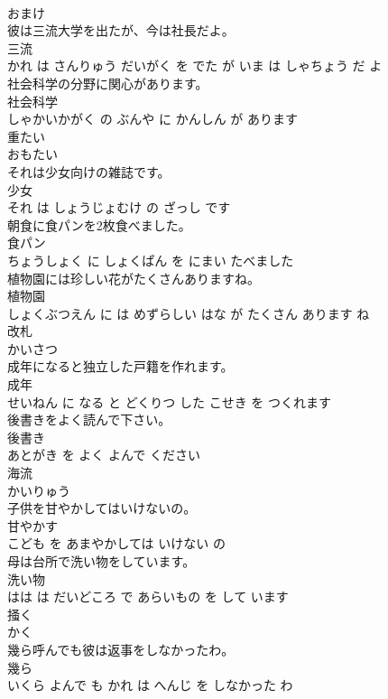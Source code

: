 \documentclass[8pt]{extreport}
\begin{document}
\begin{CJK}{UTF8}{min}
\\	おまけ			
\\	彼は三流大学を出たが、今は社長だよ。	
\\	三流 
\\	かれ は さんりゅう だいがく を でた が いま は しゃちょう だ よ			
\\	社会科学の分野に関心があります。	
\\	社会科学 
\\	しゃかいかがく の ぶんや に かんしん が あります			
\\	重たい	
\\	おもたい			
\\	それは少女向けの雑誌です。	
\\	少女 
\\	それ は しょうじょむけ の ざっし です			
\\	朝食に食パンを2枚食べました。	
\\	食パン 
\\	ちょうしょく に しょくぱん を にまい たべました			
\\	植物園には珍しい花がたくさんありますね。	
\\	植物園 
\\	しょくぶつえん に は めずらしい はな が たくさん あります ね			
\\	改札	
\\	かいさつ			
\\	成年になると独立した戸籍を作れます。	
\\	成年 
\\	せいねん に なる と どくりつ した こせき を つくれます			
\\	後書きをよく読んで下さい。	
\\	後書き 
\\	あとがき を よく よんで ください			
\\	海流	
\\	かいりゅう			
\\	子供を甘やかしてはいけないの。	
\\	甘やかす 
\\	こども を あまやかしては いけない の			
\\	母は台所で洗い物をしています。	
\\	洗い物 
\\	はは は だいどころ で あらいもの を して います			
\\	掻く	
\\	かく			
\\	幾ら呼んでも彼は返事をしなかったわ。	
\\	幾ら 
\\	いくら よんで も かれ は へんじ を しなかった わ			

\end{CJK}
\end{document}
